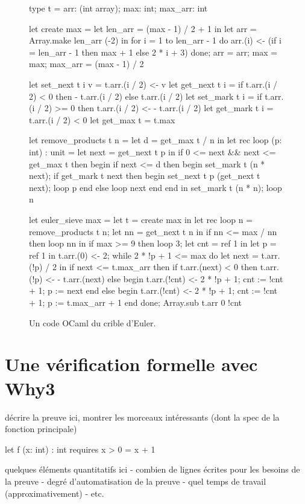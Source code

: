 \documentclass[a4paper]{easychair}
\begin{document}
\begin{figure}[tp]
\begin{ocaml}
type t = { arr: (int array); max: int; max_arr: int }

let create max =
  let len_arr = (max - 1) / 2 + 1 in
  let arr = Array.make len_arr (-2) in
  for i = 1 to len_arr - 1 do
    arr.(i) <- (if i = len_arr - 1 then max + 1 else 2 * i + 3)
  done;
  { arr = arr; max = max; max_arr = (max - 1) / 2 }

let set_next t i v = t.arr.(i / 2) <- v
let get_next t i = if t.arr.(i / 2) < 0 then - t.arr.(i / 2) else t.arr.(i / 2)
let set_mark t i = if t.arr.(i / 2) >= 0 then t.arr.(i / 2) <- - t.arr.(i / 2)
let get_mark t i = t.arr.(i / 2) < 0
let get_max t = t.max

let remove_products t n =
  let d = get_max t / n in
  let rec loop (p: int) : unit =
    let next = get_next t p in
    if 0 <= next && next <= get_max t then begin
      if next <= d then begin
        set_mark t (n * next);
        if get_mark t next then begin set_next t p (get_next t next); loop p end
        else loop next
      end end in
  set_mark t (n * n); loop n

let euler_sieve max =
  let t = create max in
  let rec loop n =
    remove_products t n;
    let nn = get_next t n in
    if nn <= max / nn then loop nn in
  if max >= 9 then loop 3;
  let cnt = ref 1 in
  let p = ref 1 in t.arr.(0) <- 2;
  while 2 * !p + 1 <= max do
    let next = t.arr.(!p) / 2 in
    if next <= t.max_arr then
      if t.arr.(next) < 0 then t.arr.(!p) <- - t.arr.(next)
      else begin t.arr.(!cnt) <- 2 * !p + 1; cnt := !cnt + 1; p := next end
    else begin t.arr.(!cnt) <- 2 * !p + 1; cnt := !cnt + 1; p := t.max_arr + 1 end
  done;
  Array.sub t.arr 0 !cnt
\end{ocaml}
\caption{Un code OCaml du crible d'Euler.}
\label{fig:codeOCaml}
\end{figure}

\section{Une vérification formelle avec Why3}

décrire la preuve ici, montrer les morceaux intéressants
(dont la spec de la fonction principale)

\begin{why3}
  let f (x: int) : int
    requires { x > 0 }
  =
    x + 1
\end{why3}

quelques éléments quantitatifs ici
- combien de lignes écrites pour les besoins de la preuve
- degré d'automatisation de la preuve
- quel temps de travail (approximativement)
- etc.
\end{document}
